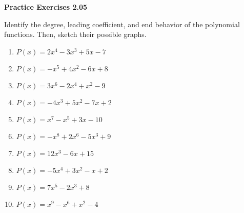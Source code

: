 \vspace{0.3ex}
\noindent\textbf{Practice Exercises 2.05}

\vspace{0.2ex}

Identify the degree, leading coefficient, and end behavior of the polynomial functions. Then, sketch their possible graphs.
\begin{multicols}{2}
\begin{enumerate}
    \item \( P(x) = 2x^4 - 3x^3 + 5x - 7 \)
    \item \( P(x) = -x^5 + 4x^2 - 6x + 8 \)
    \item \( P(x) = 3x^6 - 2x^4 + x^2 - 9 \)
    \item \( P(x) = -4x^3 + 5x^2 - 7x + 2 \)
    \item \( P(x) = x^7 - x^5 + 3x - 10 \)
    \item \( P(x) = -x^8 + 2x^6 - 5x^3 + 9 \)
    \item \( P(x) = 12x^3 - 6x + 15 \)
    \item \( P(x) = -5x^4 + 3x^2 - x + 2 \)
    \item \( P(x) = 7x^5 - 2x^3 + 8 \)
    \item \( P(x) = x^9 - x^6 + x^2 - 4 \)
\end{enumerate}
\end{multicols}
